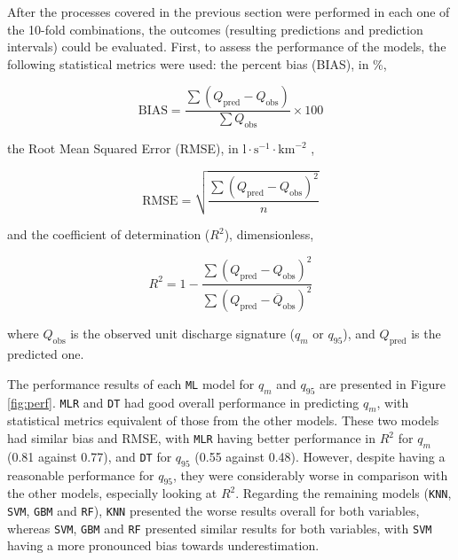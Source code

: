 \documentclass[12pt]{article}
\begin{document}
\par After the processes covered in the previous section were performed in each one of the 10-fold combinations, the outcomes (resulting predictions and prediction intervals) could be evaluated. First, to assess the performance of the models, the following statistical metrics were used:
the percent bias (BIAS), in \%,
\begin{linenomath*}
\begin{equation}
\label{eq:bias}
\text{BIAS} = \frac{\sum (Q_{\text{pred}} - Q_{\text{obs}})}{\sum Q_{\text{obs}}} \times 100
\end{equation}
\end{linenomath*}
the Root Mean Squared Error (RMSE), in $\text{l}\cdot \text{s}^{-1}\cdot \text{km}^{-2}$ ,
\begin{linenomath*}
\begin{equation}
\label{eq:rmse}
\text{RMSE} = \sqrt{ \frac{\sum (Q_{\text{pred}} - Q_{\text{obs}})^2}{n}}
\end{equation}
\end{linenomath*}
and the coefficient of determination ($R^2$), dimensionless,
\begin{linenomath*}
\begin{equation}
\label{eq:r2}
R^2 = 1 - \frac{\sum (Q_{\text{pred}} - Q_{\text{obs}})^2}{\sum (Q_{\text{pred}} - \overline{Q}_{\text{obs}})^2}
\end{equation}
\end{linenomath*}
where $Q_{\text{obs}}$ is the observed unit discharge signature ($q_{m}$ or $q_{95}$), and $Q_{\text{pred}}$ is the predicted one.

\par The performance results of each \texttt{ML} model for $q_{m}$ and $q_{95}$ are presented in Figure \ref{fig:perf}. \texttt{MLR} and \texttt{DT} had good overall performance in predicting $q_{m}$, with statistical metrics equivalent of those from the other models. These two models had similar bias and RMSE, with \texttt{MLR} having better performance in $R^2$ for $q_{m}$ (0.81 against 0.77), and \texttt{DT} for $q_{95}$ (0.55 against 0.48). However, despite having a reasonable performance for $q_{95}$, they were considerably worse in comparison with the other models, especially looking at $R^2$. Regarding the remaining models (\texttt{KNN}, \texttt{SVM}, \texttt{GBM} and \texttt{RF}), \texttt{KNN} presented the worse results overall for both variables, whereas \texttt{SVM}, \texttt{GBM} and \texttt{RF} presented similar results for both variables, with \texttt{SVM} having a more pronounced bias towards underestimation.
\end{document}
